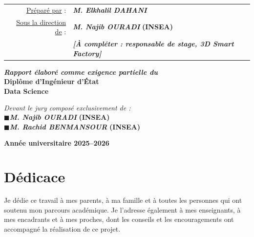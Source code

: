 \documentclass[12pt,a4paper,oneside]{report}
\newcommand{\NomEtudiant}{M. Elkhalil DAHANI}
\newcommand{\Filiere}{Data Science}
\newcommand{\AnneeUniversitaire}{2025--2026}
\newcommand{\EncadrantINSEA}{M. Najib OURADI}
\newcommand{\EncadrantOrganisme}{[À compléter : responsable de stage, 3D Smart Factory]}
\newcommand{\JureUn}{M. Najib OURADI}
\newcommand{\JureDeux}{M. Rachid BENMANSOUR}
\begin{document}
\begin{titlepage}
\vspace{1.1cm}
\hspace*{0.14\textwidth}%
\begin{minipage}{0.84\textwidth}
\begin{tabular}{r@{\hspace{0.45em}}l}
\underline{Préparé par} : & \textit{\textbf{\NomEtudiant}} \\[7pt]
\underline{Sous la direction de} : & \textit{\textbf{\EncadrantINSEA}} \textbf{(INSEA)} \\[2pt]
                                  & \textit{\textbf{\EncadrantOrganisme}} \\
\end{tabular}
\end{minipage}

\vspace{1.1cm}
\begin{center}
\textit{\textbf{Rapport élaboré comme exigence partielle du}}\\[9pt]
{\large\bfseries Diplôme d'Ingénieur d'État}\\[7pt]
{\bfseries \Filiere}
\end{center}

\vspace{0.65cm}
\begin{center}
\begin{minipage}{0.70\textwidth}
\textit{Devant le jury composé exclusivement de :}\\[5pt]
\textbf{\small$\blacksquare$}\quad\textit{\textbf{\JureUn}} \textbf{(INSEA)}\\[3pt]
\textbf{\small$\blacksquare$}\quad\textit{\textbf{\JureDeux}} \textbf{(INSEA)}
\end{minipage}
\end{center}

\vfill
\begin{center}
{\color{gray!70}\bfseries Année universitaire \AnneeUniversitaire}
\end{center}
\end{titlepage}
\restoregeometry

\clearpage\thispagestyle{empty}\null\clearpage

\setcounter{page}{1}

\chapter*{Dédicace}
\thispagestyle{plain}
\vspace{2cm}
Je dédie ce travail à mes parents, à ma famille et à toutes les personnes qui
ont soutenu mon parcours académique. Je l'adresse également à mes enseignants,
à mes encadrants et à mes proches, dont les conseils et les encouragements ont
accompagné la réalisation de ce projet.
\end{document}
